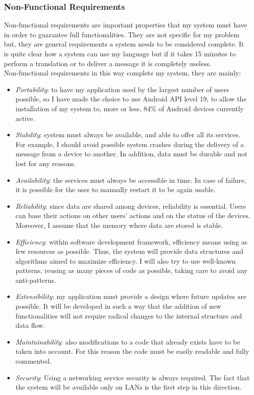 \subsubsection{Non-Functional Requirements}
Non-functional requirements are important properties that my
system must have in order to guarantee full functionalities. They are not specific
for my problem but, they are general requirements a system needs to be considered complete. It is quite clear how a system can use my language but if it takes 15 minutes to perform a translation or to deliver a message it is completely useless.\\
Non-functional requirements in this way complete my system, they are mainly:
\begin{itemize}
	\item \textit{Portability}: to have my application used by the largest number of users
	possible, so I have made the choice to use Android API level 19, to allow the installation of my system to, more or less, 84\% of Android devices currently active.
	\item \textit{Stability}: system must always be available, and able to offer all its services. For example, I should avoid possible system crashes during the delivery of a message from a device to another. In addition, data must be durable and not lost for any reasons.
	\item \textit{Availability}: the services must always be accessible in time. In case of failure, it is possible for the user to manually restart it to be again usable.
	\item \textit{Reliability}: since data are shared among devices, reliability is essential. Users can base their actions on other users’ actions and on the status of the devices. Moreover, I assume that the memory where data are stored is stable.
	\item \textit{Efficiency}: within software development framework, efficiency means
	using as few resources as possible. Thus, the system will provide data structures and algorithms aimed to maximize efficiency. I will also try to use well-known patterns, reusing as many pieces of code as possible, taking care to avoid any anti-patterns.
	\item \textit{Extensibility}: my application must provide a design where future updates
	are possible. It will be developed in such a way that the addition of new
	functionalities will not require radical changes to the internal structure and
	data flow.
	\item \textit{Maintainability}: also modifications to a code that already exists have to be
	taken into account. For this reason the code must be easily readable and
	fully commented.
	\item \textit{Security}: Using a networking service security is always required. The fact that
	the system will be available only on LANs is the first step in this direction.
\end{itemize}
